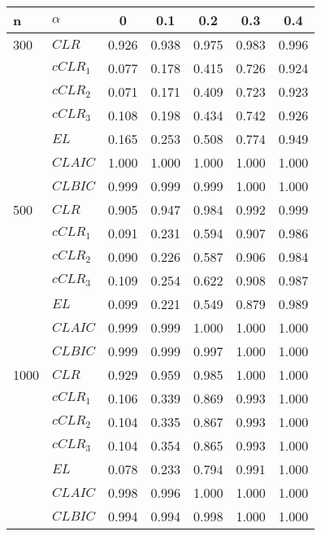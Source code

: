 \begin{tabular} 
 {l l |  *{5}{c} } 
n & $\alpha$ & 0  &  0.1 & 0.2 & 0.3 & 0.4 \\ \hline \hline 
300 & $CLR$& 0.926 &0.938 &0.975 &0.983 &0.996  \\ 
 & $cCLR_1$& 0.077 &0.178 &0.415 &0.726 &0.924  \\ 
 & $cCLR_2$& 0.071 &0.171 &0.409 &0.723 &0.923   \\ 
 & $cCLR_3$& 0.108 &0.198 &0.434 &0.742 &0.926  \\ 
 & $EL$& 0.165 &0.253 &0.508 &0.774 &0.949  \\ 
 & $CLAIC$& 1.000 &1.000 &1.000 &1.000 &1.000  \\ 
 & $CLBIC$& 0.999 &0.999 &0.999 &1.000 &1.000  \\ \hline \hline 
500 & $CLR$& 0.905 &0.947 &0.984 &0.992 &0.999  \\ 
 & $cCLR_1$& 0.091 &0.231 &0.594 &0.907 &0.986  \\ 
 & $cCLR_2$& 0.090 &0.226 &0.587 &0.906 &0.984  \\ 
 & $cCLR_3$& 0.109 &0.254 &0.622 &0.908 &0.987 \\ 
 & $EL$& 0.099 &0.221 &0.549 &0.879 &0.989 \\ 
 & $CLAIC$& 0.999 &0.999 &1.000 &1.000 &1.000  \\ 
 & $CLBIC$& 0.999 &0.999 &0.997 &1.000 &1.000  \\ \hline \hline 
1000 & $CLR$& 0.929 &0.959 &0.985 &1.000 &1.000 \\ 
 & $cCLR_1$& 0.106 &0.339 &0.869 &0.993 &1.000 \\ 
 & $cCLR_2$& 0.104 &0.335 &0.867 &0.993 &1.000  \\ 
 & $cCLR_3$& 0.104 &0.354 &0.865 &0.993 &1.000 \\ 
 & $EL$& 0.078 &0.233 &0.794 &0.991 &1.000  \\ 
 & $CLAIC$& 0.998 &0.996 &1.000 &1.000 &1.000 \\ 
 & $CLBIC$& 0.994 &0.994 &0.998 &1.000 &1.000 \\ \hline 
\hline 
 \end{tabular} 
